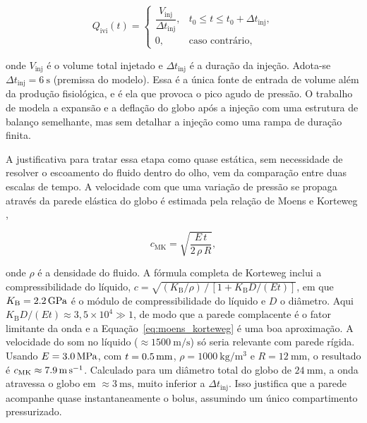 \begin{equation}
Q_{\text{ivi}}(t) =
\begin{cases}
\dfrac{V_{\text{inj}}}{\Delta t_{\text{inj}}}, & t_0 \le t \le t_0+\Delta t_{\text{inj}}, \\[6pt]
0, & \text{caso contrário},
\end{cases}
\label{eq:ivi}
\end{equation}
 
onde $V_{\text{inj}}$ é o volume total injetado e $\Delta t_{\text{inj}}$ é a duração da injeção. Adota-se $\Delta t_{\text{inj}}=\SI{6}{\second}$ (premissa do modelo). Essa é a única fonte de entrada de volume além da produção fisiológica, e é ela que provoca o pico agudo de pressão. O trabalho de \citet{ruffini2024} modela a expansão e a deflação do globo após a injeção com uma estrutura de balanço semelhante, mas sem detalhar a injeção como uma rampa de duração finita.
 
A justificativa para tratar essa etapa como quase estática, sem necessidade de resolver o escoamento do fluido dentro do olho, vem da comparação entre duas escalas de tempo. A velocidade com que uma variação de pressão se propaga através da parede elástica do globo é estimada pela relação de Moens e Korteweg \citep{fung1997},
 
\begin{equation}
c_{\text{MK}} = \sqrt{\frac{E\,t}{2\,\rho\,R}},
\label{eq:moens_korteweg}
\end{equation}
 
onde $\rho$ é a densidade do fluido. A fórmula completa de Korteweg inclui a compressibilidade do líquido, $c=\sqrt{(K_{\mathrm{B}}/\rho)\,/\,[1+K_{\mathrm{B}} D/(E t)]}$, em que $K_{\mathrm{B}}=\SI{2{,}2}{\giga\pascal}$ é o módulo de compressibilidade do líquido e $D$ o diâmetro. Aqui $K_{\mathrm{B}} D/(Et)\approx3{,}5\times10^{4}\gg1$, de modo que a parede complacente é o fator limitante da onda e a Equação~\ref{eq:moens_korteweg} é uma boa aproximação. A velocidade do som no líquido ($\approx\SI{1500}{\meter\per\second}$) só seria relevante com parede rígida. Usando $E=\SI{3{,}0}{\mega\pascal}$, com $t=\SI{0{,}5}{\milli\meter}$, $\rho=\SI{1000}{\kilo\gram\per\meter\cubed}$ e $R=\SI{12}{\milli\meter}$, o resultado é $c_{\text{MK}}\approx\SI{7{,}9}{\meter\per\second}$. Calculado para um diâmetro total do globo de $\SI{24}{\milli\meter}$, a onda atravessa o globo em $\approx\SI{3}{\milli\second}$, muito inferior a $\Delta t_{\text{inj}}$. Isso justifica que a parede acompanhe quase instantaneamente o bolus, assumindo um único compartimento pressurizado.
 
